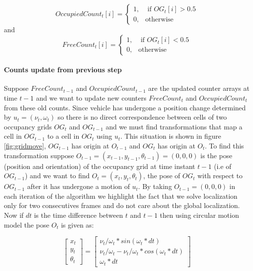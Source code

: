 \begin{equation}
OccupiedCount_t[i] =  \begin{cases} 1, & \mbox{ if $OG_t[i] > 0.5$} \\
                       0, & \mbox{otherwise} \end{cases}
\end{equation}
and
\begin{equation}
FreeCount_t[i] = \begin{cases} 1, & \mbox{ if $OG_t[i] < 0.5$} \\
                       0, & \mbox{otherwise} \end{cases}
\end{equation}

\paragraph{Counts update from previous step} Suppose $FreeCount_{t-1}$ and  $OccupiedCount_{t-1}$ are the
updated counter arrays at time $t-1$ and we want to update new counters $FreeCount_t$ and $OccupiedCount_t$
from these old counts. Since vehicle has undergone a position change determined by $u_t=(\nu_t, \omega_t)$
so there is no direct correspondence between cells of two occupancy grids $OG_t$ and $OG_{t-1}$ and we
must find transformations that map a cell in  $OG_{t-1}$ to a cell in $OG_{t}$ using $u_t$. This situation is
shown in figure \ref{fig:gridmove}, $OG_{t-1}$ has origin at $O_{t-1}$ and $OG_t$ has origin at $O_t$. To find this transformation
suppose $O_{t-1}=(x_{t-1}, y_{t-1}, \theta_{t-1}) = (0,0,0)$ is the pose (position and orientation) of the occupancy grid
at time instant $t-1$ (i.e of $OG_{t-1}$) and we want to find $O_t=(x_t, y_t, \theta_t)$, the pose of $OG_t$
with respect to $OG_{t-1}$ after it has undergone a motion of $u_t$. By taking $O_{t-1}=(0,0,0)$ in each iteration of the algorithm we highlight the fact that we solve localization only for two consecutives frames and do not care about the global localization. Now if $dt$ is the time difference between $t$ and $t-1$ then using circular motion model the pose $O_t$ is given as:

\begin{equation}
\left[\begin{array}{c}x_t \\ y_t\\ \theta_t \end{array} \right] = 
\left[\begin{array}{c} \nu_t/\omega_t * sin(\omega_t * dt) \\ \nu_t/\omega_t - \nu_t/\omega_t * cos(\omega_t * dt) \\ \omega_t * dt \end{array}\right]
\end{equation}

